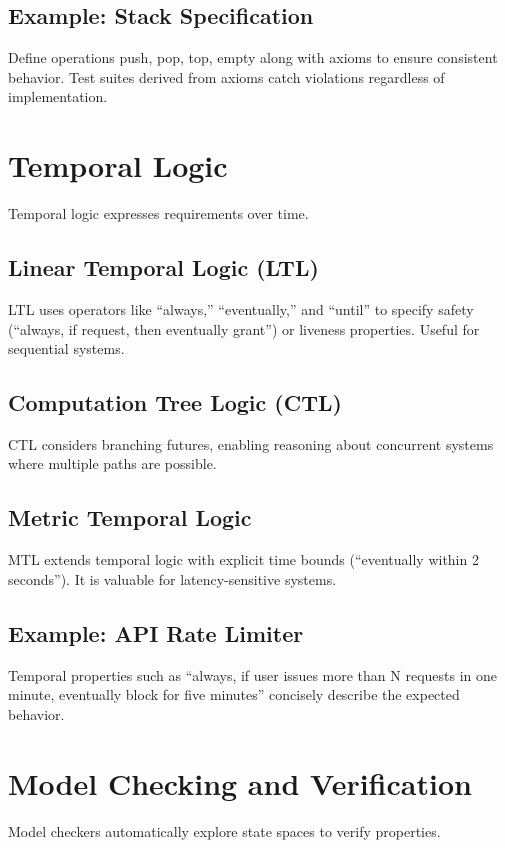\subsection{Example: Stack Specification}
Define operations push, pop, top, empty along with axioms to ensure consistent behavior. Test suites derived from axioms catch violations regardless of implementation.

\section{Temporal Logic}
\label{sec:temporal-logic}

Temporal logic expresses requirements over time.

\subsection{Linear Temporal Logic (LTL)}
LTL uses operators like ``always,'' ``eventually,'' and ``until'' to specify safety (``always, if request, then eventually grant'') or liveness properties. Useful for sequential systems.

\subsection{Computation Tree Logic (CTL)}
CTL considers branching futures, enabling reasoning about concurrent systems where multiple paths are possible.

\subsection{Metric Temporal Logic}
MTL extends temporal logic with explicit time bounds (``eventually within 2 seconds''). It is valuable for latency-sensitive systems.

\subsection{Example: API Rate Limiter}
Temporal properties such as ``always, if user issues more than N requests in one minute, eventually block for five minutes'' concisely describe the expected behavior.

\section{Model Checking and Verification}
\label{sec:model-checking}

Model checkers automatically explore state spaces to verify properties.


